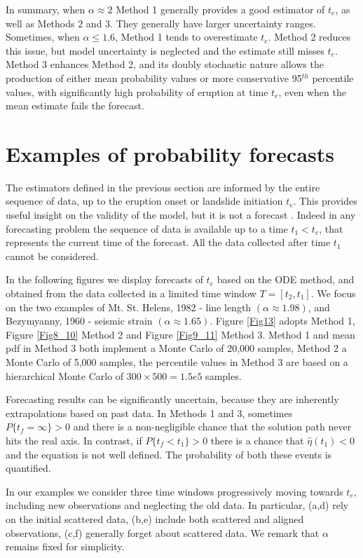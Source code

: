 \documentclass{article}
\begin{document}
In summary, when $\alpha\approx 2$ Method 1 generally provides a good estimator of $t_e$, as well as Methods 2 and 3. They generally have larger uncertainty ranges. Sometimes, when $\alpha \le 1.6$, Method 1 tends to overestimate $t_e$. Method 2 reduces this issue, but model uncertainty is neglected and the estimate still misses $t_e$. Method 3 enhances Method 2, and its doubly stochastic nature allows the production of either mean probability values or more conservative 95$^{th}$ percentile values, with significantly high probability of eruption at time $t_e$, even when the mean estimate fails the forecast.

\section{Examples of probability forecasts}
The estimators defined in the previous section are informed by the entire sequence of data, up to the eruption onset or landslide initiation $t_e$. This provides useful insight on the validity of the model, but it is not a forecast \citep{Boue2015}. Indeed in any forecasting problem the sequence of data is available up to a time $t_1<t_e$, that represents the current time of the forecast. All the data collected after time $t_1$ cannot be considered.

In the following figures we display forecasts of $t_e$ based on the ODE method, and obtained from the data collected in a limited time window $T=[t_2,t_1]$. We focus on the two examples of Mt. St. Helens, 1982 - line length $(\alpha\approx1.98)$, and Bezymyanny, 1960 - seismic strain $(\alpha\approx1.65)$. Figure \ref{Fig13} adopts Method 1, Figure \ref{Fig8_10} Method 2 and Figure \ref{Fig9_11} Method 3. Method 1 and mean pdf in Method 3 both implement a Monte Carlo of 20,000 samples, Method 2 a Monte Carlo of 5,000 samples, the percentile values in Method 3 are based on a hierarchical Monte Carlo of $300\times 500=1.5e5$ samples.

Forecasting results can be significantly uncertain, because they are inherently extrapolations based on past data. In Methods 1 and 3, sometimes $P\{t_f=\infty\} >0$ and there is a non-negligible chance that the solution path never hits the real axis. In contrast, if $P\{t_f<t_1\} >0$ there is a chance that $\hat\eta(t_1)<0$ and the equation is not well defined. The probability of both these events is quantified.

In our examples we consider three time windows progressively moving towards $t_e$, including new observations and neglecting the old data. In particular, (a,d) rely on the initial scattered data, (b,e) include both scattered and aligned observations, (c,f) generally forget about scattered data. We remark that $\alpha$ remains fixed for simplicity.
\end{document}
